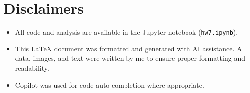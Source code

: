 \documentclass[12pt]{article}
\begin{document}
\section{Disclaimers}
\begin{itemize}
    \item All code and analysis are available in the Jupyter notebook (\texttt{hw7.ipynb}).
    \item This LaTeX document was formatted and generated with AI assistance. All data, images, and text were written by me to ensure proper formatting and readability.
    \item Copilot was used for code auto-completion where appropriate.
\end{itemize}
\end{document}
